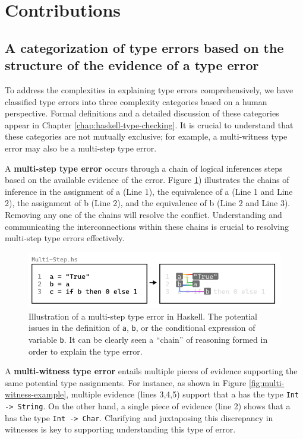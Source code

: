 \section{Contributions}

\subsection{A categorization of type errors based on the structure of the evidence of a type error}

To address the complexities in explaining type errors comprehensively, we have classified type errors into three complexity categories based on a human perspective. Formal definitions and a detailed discussion of these categories appear in Chapter \ref{chap:haskell-type-checking}. It is crucial to understand that these categories are not mutually exclusive; for example, a multi-witness type error may also be a multi-step type error.


A \textbf{multi-step type error} occurs through a chain of logical inferences steps based on the available evidence of the error. Figure \ref{fig:multi-step-example}) illustrates the chains of inference in the assignment of a (Line 1), the equivalence of a (Line 1 and Line 2), the assignment of b (Line 2), and the equivalence of b (Line 2 and Line 3). Removing any one of the chains will resolve the conflict. Understanding and communicating the interconnections within these chains is crucial to resolving multi-step type errors effectively.

\begin{figure}[hbt]
  \includegraphics[width=\linewidth]{Multi-Step}
  \caption{
    \label{fig:multi-step-example}
    Illustration of a multi-step type error in Haskell.  The potential issues in the definition of \texttt{a}, \texttt{b}, or the conditional expression of variable \texttt{b}. It can be clearly seen a ``chain'' of reasoning formed in order to explain the type error. }
\end{figure}

A \textbf{multi-witness type error} entails multiple pieces of evidence supporting the same potential type assignments. For instance, as shown in Figure \ref{fig:multi-witness-example}, multiple evidence (lines 3,4,5) support that a has the type \texttt{Int -> String}. On the other hand, a single piece of evidence (line 2) shows that a has the type \texttt{Int -> Char}.  Clarifying and juxtaposing this discrepancy in witnesses is key to supporting understanding this type of error.

